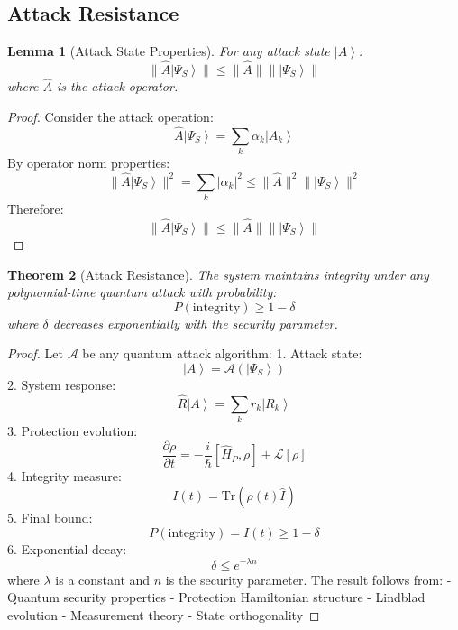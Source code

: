 \documentclass[12pt]{article}
\newcommand{\ket}[1]{\left|#1\right\rangle}
\newcommand{\tr}{\text{Tr}}
\newcommand{\op}[1]{\hat{#1}}
\newtheorem{theorem}{Theorem}[section]
\newtheorem{lemma}[theorem]{Lemma}
\begin{document}
\subsection{Attack Resistance}
\begin{lemma}[Attack State Properties]
For any attack state $\ket{A}$:
\begin{equation}
\|\op{A}\ket{\Psi_S}\| \leq \|\op{A}\|\|\ket{\Psi_S}\|
\end{equation}
where $\op{A}$ is the attack operator.
\end{lemma}
\begin{proof}
Consider the attack operation:
\begin{equation}
\op{A}\ket{\Psi_S} = \sum_k \alpha_k\ket{A_k}
\end{equation}
By operator norm properties:
\begin{equation}
\|\op{A}\ket{\Psi_S}\|^2 = \sum_k |\alpha_k|^2 \leq \|\op{A}\|^2\|\ket{\Psi_S}\|^2
\end{equation}
Therefore:
\begin{equation}
\|\op{A}\ket{\Psi_S}\| \leq \|\op{A}\|\|\ket{\Psi_S}\|
\end{equation}
\end{proof}
\begin{theorem}[Attack Resistance]
The system maintains integrity under any polynomial-time quantum attack with probability:
\begin{equation}
P(\text{integrity}) \geq 1 - \delta
\end{equation}
where $\delta$ decreases exponentially with the security parameter.
\end{theorem}
\begin{proof}
Let $\mathcal{A}$ be any quantum attack algorithm:
1. Attack state:
\begin{equation}
\ket{A} = \mathcal{A}(\ket{\Psi_S})
\end{equation}
2. System response:
\begin{equation}
\op{R}\ket{A} = \sum_k r_k\ket{R_k}
\end{equation}
3. Protection evolution:
\begin{equation}
\frac{\partial\rho}{\partial t} = -\frac{i}{\hbar}[\op{H}_P,\rho] + \mathcal{L}[\rho]
\end{equation}
4. Integrity measure:
\begin{equation}
I(t) = \tr(\rho(t)\op{I})
\end{equation}
5. Final bound:
\begin{equation}
P(\text{integrity}) = I(t) \geq 1 - \delta
\end{equation}
6. Exponential decay:
\begin{equation}
\delta \leq e^{-\lambda n}
\end{equation}
where $\lambda$ is a constant and $n$ is the security parameter.
The result follows from:
- Quantum security properties
- Protection Hamiltonian structure
- Lindblad evolution
- Measurement theory
- State orthogonality
\end{proof}
\end{document}
